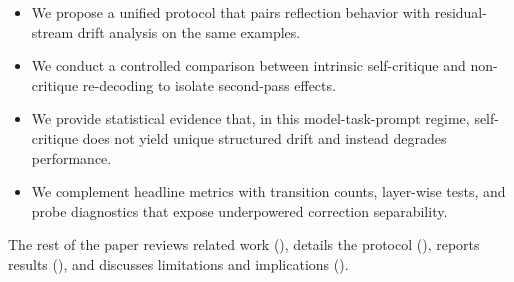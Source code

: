 \begin{itemize}
    \item We propose a unified protocol that pairs reflection behavior with residual-stream drift analysis on the same examples.
    \item We conduct a controlled comparison between intrinsic self-critique and non-critique re-decoding to isolate second-pass effects.
    \item We provide statistical evidence that, in this model-task-prompt regime, self-critique does not yield unique structured drift and instead degrades performance.
    \item We complement headline metrics with transition counts, layer-wise tests, and probe diagnostics that expose underpowered correction separability.
\end{itemize}

The rest of the paper reviews related work (), details the protocol (), reports results (), and discusses limitations and implications ().
